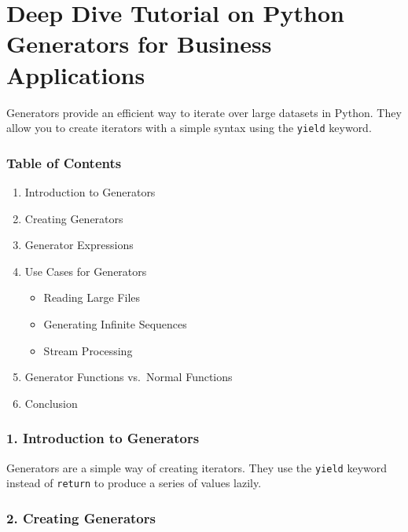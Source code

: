 \documentclass[
  letterpaper,
  DIV=11,
  numbers=noendperiod]{scrreprt}
\providecommand{\tightlist}{%
  \setlength{\itemsep}{0pt}\setlength{\parskip}{0pt}}\usepackage{longtable,booktabs,array}
\begin{document}

\chapter{Deep Dive Tutorial on Python Generators for Business
Applications}\label{deep-dive-tutorial-on-python-generators-for-business-applications}

Generators provide an efficient way to iterate over large datasets in
Python. They allow you to create iterators with a simple syntax using
the \texttt{yield} keyword.

\subsection{Table of Contents}\label{table-of-contents-14}

\begin{enumerate}
\def\labelenumi{\arabic{enumi}.}
\tightlist
\item
  Introduction to Generators
\item
  Creating Generators
\item
  Generator Expressions
\item
  Use Cases for Generators

  \begin{itemize}
  \tightlist
  \item
    Reading Large Files
  \item
    Generating Infinite Sequences
  \item
    Stream Processing
  \end{itemize}
\item
  Generator Functions vs.~Normal Functions
\item
  Conclusion
\end{enumerate}

\subsection{1. Introduction to
Generators}\label{introduction-to-generators}

Generators are a simple way of creating iterators. They use the
\texttt{yield} keyword instead of \texttt{return} to produce a series of
values lazily.

\subsection{2. Creating Generators}\label{creating-generators}
\end{document}
